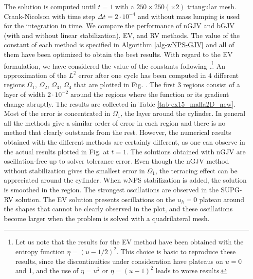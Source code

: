 The solution is computed until $t=1$ with a $250 \times 250 (\times 2)$ triangular mesh. Crank-Nicolson with time step $\Delta t = 2\cdot 10^{-4}$ and without mass lumping is used for the integration in time.  We compare the performance of nGJV and bGJV (with and without linear stabilization), EV, and RV  methods. The value of the constant of each method is specified in Algorithm \ref{alg-wNPS-GJV} and all of them have been optimized to obtain the best results. With regard to the EV formulation, we have considered the value of the constants following \cite{guermond_entropy_2011}.\footnote{Let us note that the results for the EV method have been obtained with the entropy function $\eta = (u- 1/2)^2$. This choice is basic to reproduce these results, since the discontinuities under consideration have plateaus on $u = 0$ and 1, and the use of $\eta = u^2$ or $\eta = (u-1)^2$ leads to worse results.} %
An approximation of the $L^2$ error after one cycle has been computed in $4$ different regions $\Omega_1$, $\Omega_2$, $\Omega_3$, $\Omega_4$ that are plotted in Fig. . The first $3$ regions consist of a layer of width $2\cdot 10^{-2}$ around the regions where the function or its gradient change abruptly. The results are collected in Table \ref{tab-ex15_malla2D_new}. Most of the error is concentrated in $\Omega_1$, the layer around the cylinder. In general all the methods give a similar order of error in each region and there is no method that clearly outstands from the rest. 
However, the numerical results obtained with the different methods are certainly different, as one can observe in the actual results plotted in Fig.  at $t = 1$. The solutions obtained with nGJV are oscillation-free up to solver tolerance error. Even though the nGJV method without stabilization gives the smallest error in $\Omega_1$, the terracing effect can be appreciated around the cylinder. When wNPS stabilization is added, the solution is smoothed in the region. The strongest oscillations are observed in the SUPG-RV solution. The EV solution presents oscillations on the $u_h=0$ plateau around the shapes that cannot be clearly observed in the plot, and these oscillations become larger when the problem is solved with a quadrilateral mesh. %
